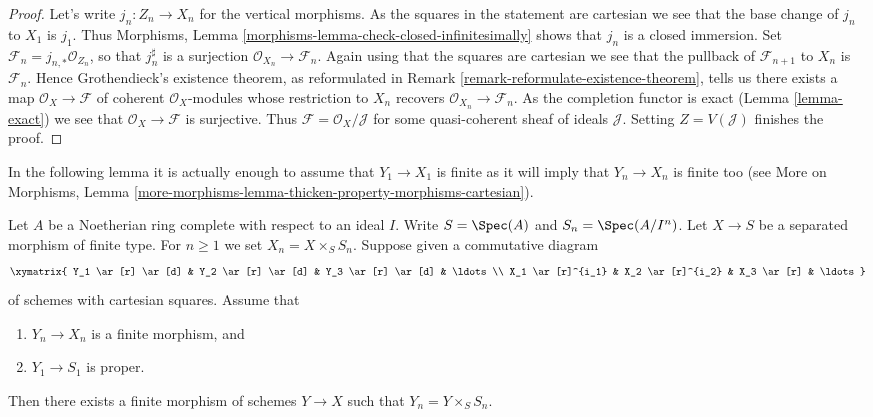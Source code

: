 \begin{proof}
Let's write $j_n : Z_n \to X_n$ for the vertical morphisms.
As the squares in the statement are cartesian
we see that the base change of $j_n$ to $X_1$ is $j_1$.
Thus Morphisms, Lemma \ref{morphisms-lemma-check-closed-infinitesimally}
shows that $j_n$ is a closed immersion.
Set $\mathcal{F}_n = j_{n, *}\mathcal{O}_{Z_n}$, so that
$j_n^\sharp$ is a surjection $\mathcal{O}_{X_n} \to \mathcal{F}_n$.
Again using that the squares are cartesian we see that
the pullback of $\mathcal{F}_{n + 1}$ to $X_n$ is $\mathcal{F}_n$.
Hence Grothendieck's existence theorem, as reformulated in
Remark \ref{remark-reformulate-existence-theorem},
tells us there exists a map
$\mathcal{O}_X \to \mathcal{F}$
of coherent $\mathcal{O}_X$-modules whose restriction to
$X_n$ recovers $\mathcal{O}_{X_n} \to \mathcal{F}_n$.
As the completion functor is exact (Lemma \ref{lemma-exact})
we see that $\mathcal{O}_X \to \mathcal{F}$
is surjective. Thus $\mathcal{F} = \mathcal{O}_X/\mathcal{J}$
for some quasi-coherent sheaf of ideals $\mathcal{J}$.
Setting $Z = V(\mathcal{J})$ finishes the proof.
\end{proof}

\noindent
In the following lemma it is actually enough to assume that $Y_1 \to X_1$
is finite as it will imply that $Y_n \to X_n$ is finite too
(see More on Morphisms, Lemma
\ref{more-morphisms-lemma-thicken-property-morphisms-cartesian}).

\begin{lemma}
\label{lemma-algebraize-formal-scheme-finite-over-proper}
Let $A$ be a Noetherian ring complete with respect to an ideal $I$.
Write $S = \Spec(A)$ and $S_n = \Spec(A/I^n)$.
Let $X \to S$ be a separated morphism of finite type.
For $n \geq 1$ we set $X_n = X \times_S S_n$.
Suppose given a commutative diagram
$$
\xymatrix{
Y_1 \ar[r] \ar[d] & Y_2 \ar[r] \ar[d] & Y_3 \ar[r] \ar[d] & \ldots \\
X_1 \ar[r]^{i_1} & X_2 \ar[r]^{i_2} & X_3 \ar[r] & \ldots
}
$$
of schemes with cartesian squares. Assume that
\begin{enumerate}
\item $Y_n \to X_n$ is a finite morphism, and
\item $Y_1 \to S_1$ is proper.
\end{enumerate}
Then there exists a finite morphism of schemes $Y \to X$ such that
$Y_n = Y \times_S S_n$.
\end{lemma}


